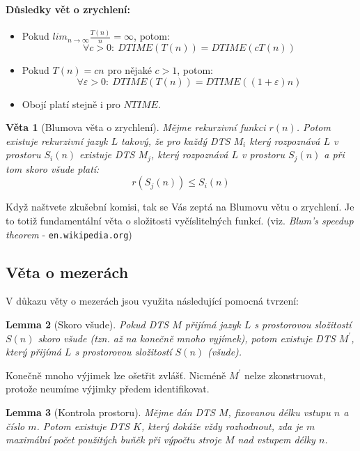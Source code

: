 \documentclass[a4paper]{article}      %
\newtheorem{theorem}{Věta}[section]
\newtheorem{lemma}[theorem]{Lemma}
\newenvironment{remark}[1][Pozorování]{\begin{trivlist}
\item[\hskip \labelsep {\bfseries #1}]}{\end{trivlist}}
\begin{document}
\paragraph{Důsledky vět o zrychlení:}
\begin{itemize}
\item Pokud $lim_{n\rightarrow \infty} \frac{T(n)}{n} = \infty$, potom:
\[
\forall c>0:\ DTIME(T(n))=DTIME(cT(n)) 
\]
\item Pokud $T(n)=cn$ pro nějaké $c>1$, potom:
\[
\forall \varepsilon >0:\ DTIME(T(n))=DTIME((1+\varepsilon)n)
\]
\item Obojí platí stejně i pro $NTIME$.
\end{itemize}

\begin{theorem}[Blumova věta o zrychlení]
Mějme rekurzivní funkci $r(n)$. Potom existuje rekurzivní jazyk $L$ takový, že pro každý DTS $M_i$ který rozpoznává $L$ v prostoru
$S_{i}(n)$ existuje DTS $M_{j}$, který rozpoznává $L$ v prostoru $S_{j}(n)$ a při tom \emph{skoro všude} platí:
\[
r(S_{j}(n)) \leq S_{i}(n) 
\]
\end{theorem}

\begin{remark}
Když naštvete zkušební komisi, tak se Vás zeptá na Blumovu větu o zrychlení.
Je to totiž fundamentální věta o složitosti vyčíslitelných funkcí. (viz. \emph{Blum's speedup theorem} - \verb+en.wikipedia.org+)
\end{remark}

\subsection{Věta o mezerách}
V důkazu věty o mezerách jsou využita následující pomocná tvrzení:

\begin{lemma}[Skoro všude]
Pokud DTS $M$ přijímá jazyk $L$ s prostorovou složitostí $S(n)$ skoro všude (tzn. až na konečně mnoho vyjímek),
potom existuje DTS $M^{'}$, který přijímá $L$ s prostorovou složitostí $S(n)$ (všude). 
\end{lemma}

\begin{remark}
Konečně mnoho výjimek lze ošetřit zvlášť. Nicméně $M^{'}$ nelze zkonstruovat, protože neumíme výjimky předem identifikovat. 
\end{remark}

\begin{lemma}[Kontrola prostoru]
Mějme dán DTS $M$, fixovanou délku vstupu $n$ a číslo $m$. Potom existuje DTS $K$, který dokáže vždy rozhodnout, zda je $m$
maximální počet použitých buňěk při výpočtu stroje $M$ nad vstupem délky $n$.
\end{lemma}
\end{document}
